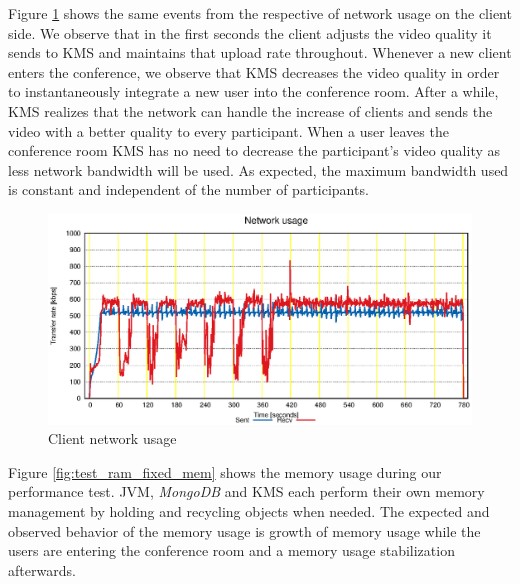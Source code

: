 \documentclass[10pt,conference]{IEEEtran}
\begin{document}


Figure \ref{fig:test_client_net} shows the same events from the respective of network usage on the client side.
We observe that in the first seconds the client adjusts the video quality it sends to \gls{KMS} and maintains that upload rate throughout.
Whenever a new client enters the conference, we observe that \gls{KMS} decreases the video quality in order to instantaneously integrate a new user into the conference room.
After a while, \gls{KMS} realizes that the network can handle the increase of clients and sends the video with a better quality to every participant.
When a user leaves the conference room \gls{KMS} has no need to decrease the participant's video quality as less network bandwidth will be used.
As expected, the maximum bandwidth used is constant and independent of the number of participants.

\begin{figure}
  \centering
  \includegraphics[width=\linewidth]{stats/test_client_net.eps}
  \caption{Client network usage}
  \label{fig:test_client_net}
\end{figure}

Figure \ref{fig:test_ram_fixed_mem} shows the memory usage during our performance test.
\gls{JVM}, \emph{MongoDB} and \gls{KMS} each perform their own memory management by holding and recycling objects when needed.
The expected and observed behavior of the memory usage is growth of memory usage while the users are entering the conference room and a memory usage stabilization afterwards.
\end{document}
